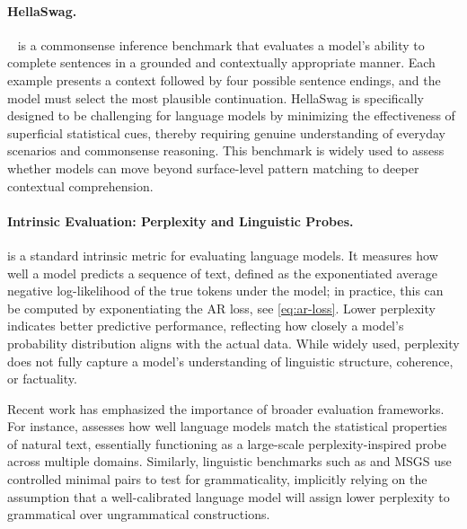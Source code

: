 \paragraph{HellaSwag.} ~\citep{zellers2019hellaswag} is a commonsense inference benchmark that evaluates a model's ability to complete sentences in a grounded and contextually appropriate manner. Each example presents a context followed by four possible sentence endings, and the model must select the most plausible continuation. HellaSwag is specifically designed to be challenging for language models by minimizing the effectiveness of superficial statistical cues, thereby requiring genuine understanding of everyday scenarios and commonsense reasoning. This benchmark is widely used to assess whether models can move beyond surface-level pattern matching to deeper contextual comprehension.

\paragraph{Intrinsic Evaluation: Perplexity and Linguistic Probes.} 
 \citep{jelinek1977perplexity} is a standard intrinsic metric for evaluating language models. It measures how well a model predicts a sequence of text, defined as the exponentiated average negative log-likelihood of the true tokens under the model; in practice, this can be computed by exponentiating the AR loss, see \cref{eq:ar-loss}. Lower perplexity indicates better predictive performance, reflecting how closely a model's probability distribution aligns with the actual data. While widely used, perplexity does not fully capture a model's understanding of linguistic structure, coherence, or factuality.

Recent work has emphasized the importance of broader evaluation frameworks. For instance,  \citep{magnusson2024paloma} assesses how well language models match the statistical properties of natural text, essentially functioning as a large-scale perplexity-inspired probe across multiple domains. Similarly, linguistic benchmarks such as  and MSGS \citep{warstadt2020blimp, warstadt2020msgs} use controlled minimal pairs to test for grammaticality, implicitly relying on the assumption that a well-calibrated language model will assign lower perplexity to grammatical over ungrammatical constructions.


